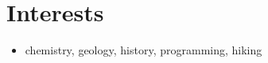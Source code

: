 \documentclass[a4paper,12pt]{article}
\begin{document}
\section{Interests}
\begin{itemize}[nosep, after=\strut, leftmargin=1em, itemsep=3pt]
\item chemistry, geology, history, programming, hiking
\end{itemize}

\vfill
{}
\end{document}
